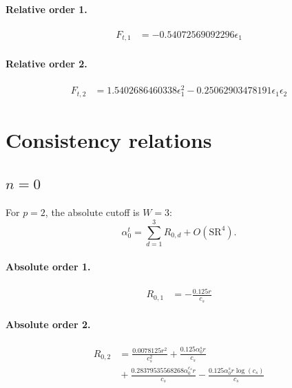 \documentclass[10pt]{article}
\begin{document}
\paragraph{Relative order 1.}
\begin{align*}
F_{t,1} &=  - 0.54072569092296 \epsilon_{1}
\end{align*}

\paragraph{Relative order 2.}
\begin{align*}
F_{t,2} &= 1.5402686460338 \epsilon_{1}^{2} - 0.25062903478191 \epsilon_{1} \epsilon_{2}
\end{align*}

\section{Consistency relations}
\subsection{$n=0$}
For $p=2$, the absolute cutoff is $W=3$:
\[\alpha_{0}^t=\sum_{d=1}^{3}R_{0,d}+O(\mathrm{SR}^{4}).\]
\paragraph{Absolute order 1.}
\begin{align*}
R_{0,1} &=  - \frac{0.125 r}{c_{s}}
\end{align*}

\paragraph{Absolute order 2.}
\begin{align*}
R_{0,2} &= \frac{0.0078125 r^{2}}{c_{s}^{2}} + \frac{0.125 \alpha_{0}^s r}{c_{s}} \\
&{}  + \frac{0.28379535568268 \alpha_{0}^{c_s} r}{c_{s}} - \frac{0.125 \alpha_{0}^s r \log{\left(c_{s} \right)}}{c_{s}}
\end{align*}
\end{document}
